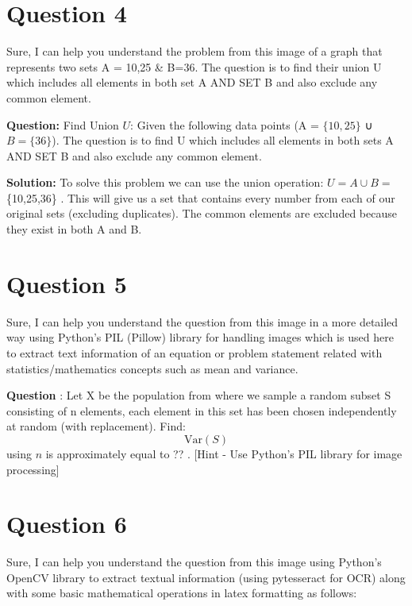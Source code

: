\documentclass[12pt]{article}
\begin{document}
\newpage\n
\section*{Question 4}\n
Sure, I can help you understand the problem from this image of a graph that represents two sets A = {10,25} & B={36}. The question is to find their union U which includes all elements in both set A AND SET B and also exclude any common element. 

\textbf{Question:} Find Union $U$: Given the following data points (A = $\{10,25\}$ ∪  $B = \{36 \}$). The question is to find U which includes all elements in both sets A AND SET B and also exclude any common element. 

\textbf{Solution:} To solve this problem we can use the union operation: $U=A \cup B = $\{10,25,36\} . This will give us a set that contains every number from each of our original sets (excluding duplicates). The common elements are excluded because they exist in both A and B.

\newpage\n
\section*{Question 5}\n
Sure, I can help you understand the question from this image in a more detailed way using Python's PIL (Pillow) library for handling images which is used here to extract text information of an equation or problem statement related with statistics/mathematics concepts such as mean and variance. 

\textbf{Question} : Let X be the population from where we sample a random subset S consisting of n elements, each element in this set has been chosen independently at random (with replacement). Find:  $$ \text{Var}(S) $$ using $n$ is approximately equal to ?? .  [Hint - Use Python's PIL library for image processing]

\newpage\n
\section*{Question 6}\n
Sure, I can help you understand the question from this image using Python's OpenCV library to extract textual information (using pytesseract for OCR) along with some basic mathematical operations in latex formatting as follows: 
\end{document}
